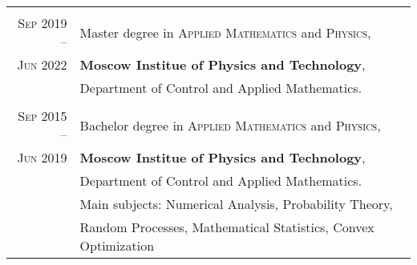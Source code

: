 \begin{center}
\begin{tabular}{r|p{10cm}}
    \multicolumn{2}{c}{} \\
    
    \textsc{Sep}  2019 -- 
    & Master degree in \textsc{Applied Mathematics} and \textsc{Physics},\\
    \textsc{Jun}  2022
    &\normalsize\textbf{Moscow Institue of Physics and Technology},\\
    &Department of Control and Applied Mathematics.\\
    
    \multicolumn{2}{c}{} \\
    
    \textsc{Sep}  2015 -- 
    & Bachelor degree in \textsc{Applied Mathematics} and \textsc{Physics},\\
    \textsc{Jun}  2019
    &\normalsize\textbf{Moscow Institue of Physics and Technology},\\
    &Department of Control and Applied Mathematics.\\
    &Main subjects: Numerical Analysis, Probability Theory,\\ 
    &Random Processes, Mathematical Statistics, Convex Optimization \\

\end{tabular}
\end{center}